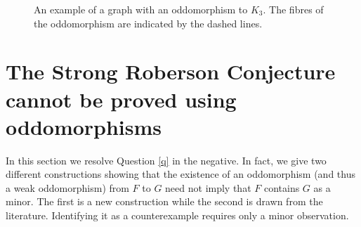 \documentclass[11pt]{article}
\begin{document}
\begin{figure}[htbp]
    \centering
    
    \caption{An example of a graph with an oddomorphism to $K_3$. The fibres of the oddomorphism are indicated by the dashed lines.}
    \label{fig:oddo_example}
\end{figure}




\section{The Strong Roberson Conjecture cannot be proved using oddomorphisms}
\label{sec:oddo-doesnt-mean-minor}
In this section we resolve Question \ref{q} in the negative.
In fact, we give two different constructions showing that the existence of an oddomorphism (and thus a weak oddomorphism) from $F$ to $G$ need not imply that $F$ contains $G$ as a minor. The first is a new construction while the second is drawn from the literature. Identifying it as a counterexample requires only a minor observation.
\end{document}
